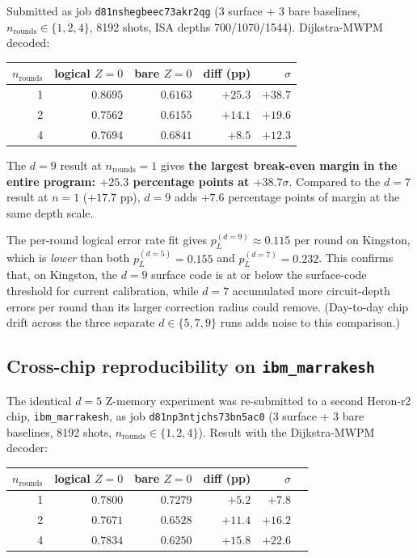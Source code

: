 \documentclass[11pt,letterpaper]{article}
\begin{document}
Submitted as job \texttt{d81nshegbeec73akr2qg} (3 surface + 3 bare baselines, $n_{\mathrm{rounds}} \in \{1, 2, 4\}$, 8192 shots, ISA depths 700/1070/1544). Dijkstra-MWPM decoded:

\begin{center}
\begin{tabular}{rrrrr}
\toprule
$n_{\mathrm{rounds}}$ & logical $Z = 0$ & bare $Z = 0$ & diff (pp) & $\sigma$ \\
\midrule
1 & $\bm{0.8695}$ & $0.6163$ & $\bm{+25.3}$ & $\bm{+38.7}$ \\
2 & $0.7562$ & $0.6155$ & $+14.1$ & $+19.6$ \\
4 & $0.7694$ & $0.6841$ & $+8.5$ & $+12.3$ \\
\bottomrule
\end{tabular}
\end{center}

The $d = 9$ result at $n_{\mathrm{rounds}} = 1$ gives \textbf{the largest break-even margin in the entire program: $+25.3$ percentage points at $+38.7\sigma$}. Compared to the $d = 7$ result at $n = 1$ ($+17.7$ pp), $d = 9$ adds $+7.6$ percentage points of margin at the same depth scale.

The per-round logical error rate fit gives $p_L^{(d=9)} \approx 0.115$ per round on Kingston, which is \emph{lower} than both $p_L^{(d=5)} = 0.155$ and $p_L^{(d=7)} = 0.232$. This confirms that, on Kingston, the $d = 9$ surface code is at or below the surface-code threshold for current calibration, while $d = 7$ accumulated more circuit-depth errors per round than its larger correction radius could remove. (Day-to-day chip drift across the three separate $d \in \{5, 7, 9\}$ runs adds noise to this comparison.)

\subsection{Cross-chip reproducibility on \texttt{ibm\_marrakesh}}\label{ssec:cross_chip}

The identical $d = 5$ Z-memory experiment was re-submitted to a second Heron-r2 chip, \texttt{ibm\_marrakesh}, as job \texttt{d81np3ntjchs73bn5ac0} (3 surface + 3 bare baselines, 8192 shots, $n_{\mathrm{rounds}} \in \{1, 2, 4\}$). Result with the Dijkstra-MWPM decoder:

\begin{center}
\begin{tabular}{rrrrrr}
\toprule
$n_{\mathrm{rounds}}$ & logical $Z = 0$ & bare $Z = 0$ & diff (pp) & $\sigma$ \\
\midrule
1 & $0.7800$ & $0.7279$ & $+5.2$ & $+7.8$ \\
2 & $0.7671$ & $0.6528$ & $+11.4$ & $+16.2$ \\
4 & $\bm{0.7834}$ & $0.6250$ & $\bm{+15.8}$ & $\bm{+22.6}$ \\
\bottomrule
\end{tabular}
\end{center}
\end{document}
